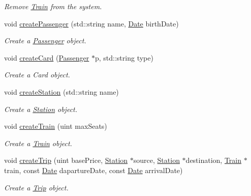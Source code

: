 \begin{DoxyCompactItemize}
\begin{DoxyCompactList}\small\item\em Remove \mbox{\hyperlink{classTrain}{Train}} from the system. \end{DoxyCompactList}\item 
void \mbox{\hyperlink{classSystem_a623d7369872a9af9b69b24bd2a3c71b1}{create\+Passenger}} (std\+::string name, \mbox{\hyperlink{classDate}{Date}} birth\+Date)
\begin{DoxyCompactList}\small\item\em Create a \mbox{\hyperlink{classPassenger}{Passenger}} object. \end{DoxyCompactList}\item 
void \mbox{\hyperlink{classSystem_a9e317da5b607c6dee850089f340dd9e7}{create\+Card}} (\mbox{\hyperlink{classPassenger}{Passenger}} $\ast$p, std\+::string type)
\begin{DoxyCompactList}\small\item\em Create a Card object. \end{DoxyCompactList}\item 
void \mbox{\hyperlink{classSystem_ab8cf1529f497af79b72fe6cc59b08d60}{create\+Station}} (std\+::string name)
\begin{DoxyCompactList}\small\item\em Create a \mbox{\hyperlink{classStation}{Station}} object. \end{DoxyCompactList}\item 
void \mbox{\hyperlink{classSystem_aa4cf09119e31e5bdf9d9187a7a60cd1a}{create\+Train}} (uint max\+Seats)
\begin{DoxyCompactList}\small\item\em Create a \mbox{\hyperlink{classTrain}{Train}} object. \end{DoxyCompactList}\item 
void \mbox{\hyperlink{classSystem_aea8519bf009400085f8e499891b7eb37}{create\+Trip}} (uint base\+Price, \mbox{\hyperlink{classStation}{Station}} $\ast$source, \mbox{\hyperlink{classStation}{Station}} $\ast$destination, \mbox{\hyperlink{classTrain}{Train}} $\ast$train, const \mbox{\hyperlink{classDate}{Date}} daparture\+Date, const \mbox{\hyperlink{classDate}{Date}} arrival\+Date)
\begin{DoxyCompactList}\small\item\em Create a \mbox{\hyperlink{classTrip}{Trip}} object. \end{DoxyCompactList}\item 
\mbox{\label{classSystem_a360f9d625dbc649d567249642c1db53c}} 

\end{DoxyCompactItemize}
